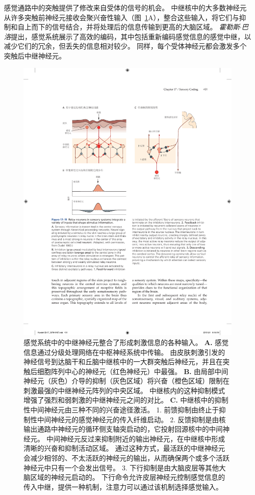 感觉通路中的突触提供了修改来自受体的信号的机会。 
中继核中的大多数神经元从许多突触前神经元接收会聚兴奋性输入（图~\ref{fig:17_11}A），整合这些输入，将它们与抑制和自上而下的信号结合，并将处理后的信息传输到更高的大脑区域。 
\textit{霍勒斯$\cdot$巴洛}提出，感觉系统展示了高效的编码，其中包括重新编码感觉信息的感觉中继，以减少它们的冗余，但丢失的信息相对较少。 
同样，每个受体神经元都会激发多个突触后中继神经元。


\begin{figure}[htbp]
	\centering
	\includegraphics[width=0.9\linewidth]{chap17/fig_17_11}
	\caption{感觉系统中的中继神经元整合了形成刺激信息的各种输入。 
		\textbf{A.} 感觉信息通过分级处理网络在中枢神经系统中传输。 
		由皮肤刺激引发的神经信号到达脑干和丘脑中继核中的一大群突触后神经元，并且在突触后细胞阵列中心的神经元（红色神经元）中最强\cite{biederman2013human}。
		\textbf{B.} 由局部中间神经元（灰色）介导的抑制（灰色区域）将兴奋（橙色区域）限制在刺激最强的中继神经元阵列的中央区域。 
		中继核内的这种抑制模式增强了强烈和弱刺激的中继神经元之间的对比。 
		\textbf{C.} 中继核中的抑制性中间神经元由三种不同的兴奋途径激活。 
		1. 前馈抑制由终止于抑制性中间神经元的感觉神经元的传入纤维启动。 
		2. 反馈抑制是由核输出通路中神经元的循环侧支轴突启动的，它投射回源核中的中间神经元。 
		中间神经元反过来抑制附近的输出神经元，在中继核中形成清晰的兴奋和抑制活动区域。 
		通过这种方式，最活跃的中继神经元会减少相邻的、不太活跃的神经元的输出，从而确保两个或多个活跃神经元中只有一个会发出信号。 
		3. 下行抑制是由大脑皮层等其他大脑区域的神经元启动的。 
		下行命令允许皮层神经元控制感觉信息的传入中继，提供一种机制，注意力可以通过该机制选择感觉输入。}
	\label{fig:17_11}
\end{figure}


